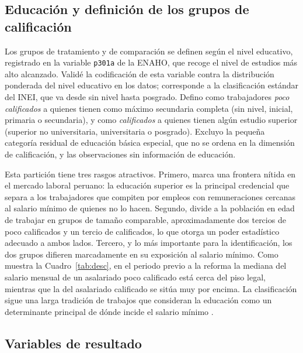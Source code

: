 \subsection{Educación y definición de los grupos de calificación}

Los grupos de tratamiento y de comparación se definen según el nivel educativo, registrado en la variable \texttt{p301a} de la ENAHO, que recoge el nivel de estudios más alto alcanzado. Validé la codificación de esta variable contra la distribución ponderada del nivel educativo en los datos; corresponde a la clasificación estándar del INEI, que va desde sin nivel hasta posgrado. Defino como trabajadores \emph{poco calificados} a quienes tienen como máximo secundaria completa (sin nivel, inicial, primaria o secundaria), y como \emph{calificados} a quienes tienen algún estudio superior (superior no universitaria, universitaria o posgrado). Excluyo la pequeña categoría residual de educación básica especial, que no se ordena en la dimensión de calificación, y las observaciones sin información de educación.

Esta partición tiene tres rasgos atractivos. Primero, marca una frontera nítida en el mercado laboral peruano: la educación superior es la principal credencial que separa a los trabajadores que compiten por empleos con remuneraciones cercanas al salario mínimo de quienes no lo hacen. Segundo, divide a la población en edad de trabajar en grupos de tamaño comparable, aproximadamente dos tercios de poco calificados y un tercio de calificados, lo que otorga un poder estadístico adecuado a ambos lados. Tercero, y lo más importante para la identificación, los dos grupos difieren marcadamente en su exposición al salario mínimo. Como muestra la Cuadro~\ref{tab:desc}, en el periodo previo a la reforma la mediana del salario mensual de un asalariado poco calificado está cerca del piso legal, mientras que la del asalariado calificado se sitúa muy por encima. La clasificación sigue una larga tradición de trabajos que consideran la educación como un determinante principal de dónde incide el salario mínimo \citep{lemos_2009, katzkowicz_2021_uruguay}.

\subsection{Variables de resultado}

